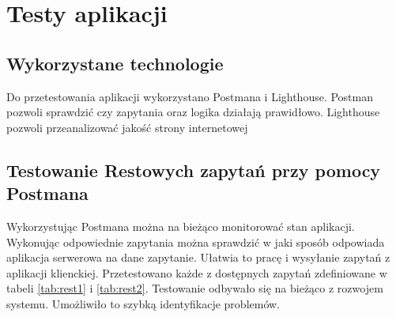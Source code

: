\chapter{Testy aplikacji}

\section{Wykorzystane technologie}

Do przetestowania aplikacji wykorzystano Postmana i Lighthouse. Postman pozwoli sprawdzić czy zapytania oraz logika działają prawidłowo. Lighthouse pozwoli przeanalizować jakość strony internetowej


\section{Testowanie Restowych zapytań przy pomocy Postmana}

Wykorzystując Postmana można na bieżąco monitorować stan aplikacji. Wykonując odpowiednie zapytania można sprawdzić w jaki sposób odpowiada aplikacja serwerowa na dane zapytanie. Ułatwia to pracę i wysyłanie zapytań z aplikacji klienckiej. Przetestowano każde z dostępnych zapytań zdefiniowane w tabeli \ref{tab:rest1} i \ref{tab:rest2}. Testowanie odbywało się na bieżąco z rozwojem systemu. Umożliwiło to szybką identyfikacje problemów.

